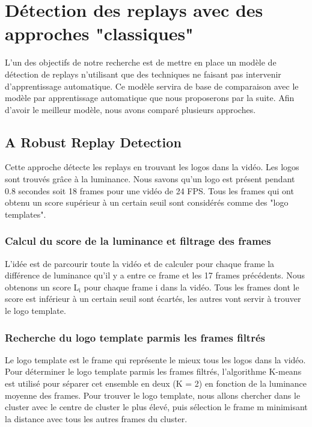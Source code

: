 \documentclass[11pt]{article}
\begin{document}
\section{Détection des replays avec des approches "classiques"}
\label{sec:org33b8082}
L'un des objectifs de notre recherche est de mettre en place un modèle de détection de replays n'utilisant que des techniques ne faisant pas intervenir d'apprentissage automatique.
Ce modèle servira de base de comparaison avec le modèle par apprentissage automatique que nous proposerons par la suite.
Afin d'avoir le meilleur modèle, nous avons comparé plusieurs approches.

\subsection{A Robust Replay Detection}
\label{sec:org6c3ec95}
Cette approche détecte les replays en trouvant les logos dans la vidéo.
Les logos sont trouvés grâce à la luminance. Nous savons qu'un logo est présent pendant 0.8 secondes soit 18 frames pour une vidéo de 24 FPS.
Tous les frames qui ont obtenu un score supérieur à un certain seuil sont considérés comme des "logo templates".

\subsubsection{Calcul du score de la luminance et filtrage des frames}
\label{sec:org4af5348}
L'idée est de parcourir toute la vidéo et de calculer pour chaque frame la différence de luminance qu'il y a entre ce frame et les 17 frames précédents.
Nous obtenons un score L\(_{\text{i}}\) pour chaque frame i dans la vidéo.
Tous les frames dont le score est inférieur à un certain seuil sont écartés, les autres vont servir à trouver le logo template.

\subsubsection{Recherche du logo template parmis les frames filtrés}
\label{sec:org97046bd}
Le logo template est le frame qui représente le mieux tous les logos dans la vidéo.
Pour déterminer le logo template parmis les frames filtrés, l'algorithme K-means est utilisé pour séparer cet ensemble en deux (K = 2) en fonction de la luminance moyenne des frames.
Pour trouver le logo template, nous allons chercher dans le cluster avec le centre de cluster le plus élevé, puis sélection le frame m minimisant la distance avec tous les autres frames du cluster.
\end{document}
